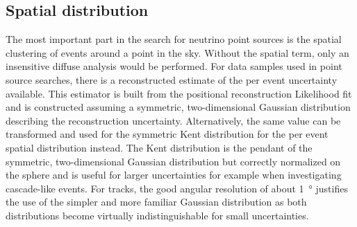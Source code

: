 \subsection{Spatial distribution}
  \label{chp:pointsource_signal_pdf}
The most important part in the search for neutrino point sources is the spatial clustering of events around a point in the sky.
Without the spatial term, only an insensitive diffuse analysis would be performed.
For data samples used in point source searches, there is a reconstructed estimate of the per event uncertainty available.
This estimator is built from the positional reconstruction Likelihood fit and is constructed assuming a symmetric, two-dimensional Gaussian distribution describing the reconstruction uncertainty.
Alternatively, the same value can be transformed and used for the symmetric Kent distribution  for the per event spatial distribution instead.
The Kent distribution is the pendant of the symmetric, two-dimensional Gaussian distribution but correctly normalized on the sphere and is useful for larger uncertainties for example when investigating cascade-like events.
For tracks, the good angular resolution of about \SI{1}{\degree} justifies the use of the simpler and more familiar Gaussian distribution as both distributions become virtually indistinguishable for small uncertainties.

